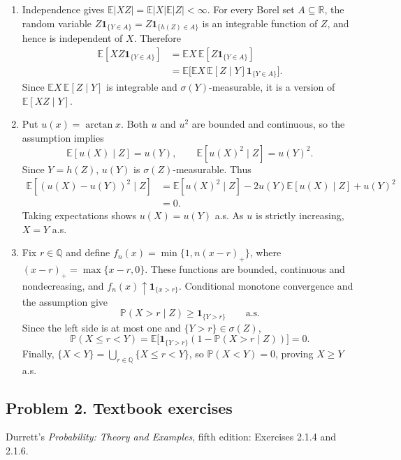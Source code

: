 \documentclass[lang=en,11pt,a4paper,citestyle=authoryear]{elegantpaper}
\newcommand{\R}{\mathbb{R}}
\newcommand{\E}{\mathbb{E}}
\renewcommand{\P}{\mathbb{P}}
\begin{document}
\begin{enumerate}[label=(\alph*),leftmargin=*]
\item Independence gives $\E|XZ|=\E|X|\E|Z|<\infty$.
For every Borel set $A\subseteq\R$, the random variable
$Z\mathbf{1}_{\{Y\in A\}}=Z\mathbf{1}_{\{h(Z)\in A\}}$ is an integrable function of $Z$, and hence is independent of $X$. Therefore
\[
\begin{aligned}
\E[XZ\mathbf{1}_{\{Y\in A\}}]
&=\E X\,\E[Z\mathbf{1}_{\{Y\in A\}}]\\
&=\E\bigl[\E X\,\E[Z\mid Y]\mathbf{1}_{\{Y\in A\}}\bigr].
\end{aligned}
\]
Since $\E X\,\E[Z\mid Y]$ is integrable and $\sigma(Y)$-measurable, it is a version of $\E[XZ\mid Y]$.

\item Put $u(x)=\arctan x$. Both $u$ and $u^2$ are bounded and continuous, so the assumption implies
\[
\E[u(X)\mid Z]=u(Y),\qquad
\E[u(X)^2\mid Z]=u(Y)^2.
\]
Since $Y=h(Z)$, $u(Y)$ is $\sigma(Z)$-measurable. Thus
\[
\begin{aligned}
\E[(u(X)-u(Y))^2\mid Z]
&=\E[u(X)^2\mid Z]-2u(Y)\E[u(X)\mid Z]+u(Y)^2\\
&=0.
\end{aligned}
\]
Taking expectations shows $u(X)=u(Y)$ a.s. As $u$ is strictly increasing, $X=Y$ a.s.

\item Fix $r\in\mathbb{Q}$ and define
$f_n(x)=\min\{1,n(x-r)_+\}$, where $(x-r)_+=\max\{x-r,0\}$.
These functions are bounded, continuous and nondecreasing, and
$f_n(x)\uparrow\mathbf{1}_{\{x>r\}}$.
Conditional monotone convergence and the assumption give
\[
\P(X>r\mid Z)\geq\mathbf{1}_{\{Y>r\}}\qquad\text{a.s.}
\]
Since the left side is at most one and $\{Y>r\}\in\sigma(Z)$,
\[
\P(X\leq r<Y)
=\E\bigl[\mathbf{1}_{\{Y>r\}}(1-\P(X>r\mid Z))\bigr]=0.
\]
Finally,
$\{X<Y\}=\bigcup_{r\in\mathbb{Q}}\{X\leq r<Y\}$,
so $\P(X<Y)=0$, proving $X\geq Y$ a.s.
\end{enumerate}
\vspace{1em}

\subsection*{Problem 2. Textbook exercises}
Durrett's \textit{Probability: Theory and Examples}, fifth edition: Exercises 2.1.4 and 2.1.6.
\end{document}
